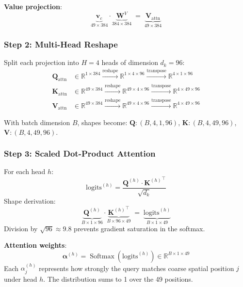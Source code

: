 \documentclass[11pt,a4paper]{article}
\DeclareMathOperator{\Softmax}{Softmax}
\newcommand{\R}{\mathbb{R}}
\newcommand{\vc}{\mathbf{v}_c}
\begin{document}
\textbf{Value projection}:
\begin{equation}
  \underbrace{\vc}_{49 \times 384}
  \cdot
  \underbrace{\mathbf{W}^V}_{384 \times 384}
  \;=\;
  \underbrace{\mathbf{V}_{\text{attn}}}_{49 \times 384}
  \label{eq:v_proj}
\end{equation}

\subsubsection{Step 2: Multi-Head Reshape}

Split each projection into $H = 4$ heads of dimension $d_k = 96$:
\begin{align}
  \mathbf{Q}_{\text{attn}} &\in \R^{1 \times 384}
    \xrightarrow{\text{reshape}} \R^{1 \times 4 \times 96}
    \xrightarrow{\text{transpose}} \R^{4 \times 1 \times 96} \\
  \mathbf{K}_{\text{attn}} &\in \R^{49 \times 384}
    \xrightarrow{\text{reshape}} \R^{49 \times 4 \times 96}
    \xrightarrow{\text{transpose}} \R^{4 \times 49 \times 96} \\
  \mathbf{V}_{\text{attn}} &\in \R^{49 \times 384}
    \xrightarrow{\text{reshape}} \R^{49 \times 4 \times 96}
    \xrightarrow{\text{transpose}} \R^{4 \times 49 \times 96}
\end{align}

With batch dimension $B$, shapes become:
$\mathbf{Q}\!: (B,4,1,96)$,\;
$\mathbf{K}\!: (B,4,49,96)$,\;
$\mathbf{V}\!: (B,4,49,96)$.

\subsubsection{Step 3: Scaled Dot-Product Attention}

For each head $h$:
\begin{equation}
  \text{logits}^{(h)} =
    \frac{\mathbf{Q}^{(h)} \cdot {\mathbf{K}^{(h)}}^\top}{\sqrt{d_k}}
\end{equation}
Shape derivation:
\begin{equation}
  \underbrace{\mathbf{Q}^{(h)}}_{B \times 1 \times 96}
  \cdot
  \underbrace{{\mathbf{K}^{(h)}}^\top}_{B \times 96 \times 49}
  \;=\;
  \underbrace{\text{logits}^{(h)}}_{B \times 1 \times 49}
\end{equation}
Division by $\sqrt{96} \approx 9.8$ prevents gradient saturation in the
softmax.

\textbf{Attention weights}:
\begin{equation}
  \boldsymbol{\alpha}^{(h)}
    = \Softmax(\text{logits}^{(h)})
    \in \R^{B \times 1 \times 49}
  \label{eq:attn_weights}
\end{equation}
Each $\alpha^{(h)}_j$ represents how strongly the query matches coarse
spatial position $j$ under head $h$. The distribution sums to 1 over the
49 positions.
\end{document}
